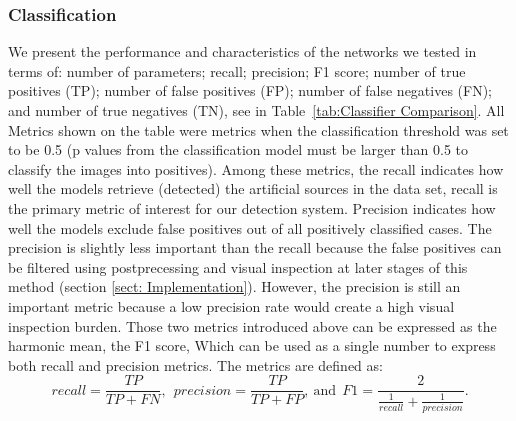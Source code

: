 \subsubsection{Classification} 
\label{subsubsect: Classification}

We present the performance and characteristics of the networks we tested in terms of: number of parameters; recall; precision; F1 score; number of true positives (TP); number of false positives (FP); number of false negatives (FN); and number of true negatives (TN), see in Table~\ref{tab:Classifier Comparison}.
All Metrics shown on the table were metrics when the classification threshold was set to be 0.5 (p values from the classification model must be larger than 0.5 to classify the images into positives).
Among these metrics, the recall indicates how well the models retrieve (detected) the artificial sources in the data set, recall is the primary metric of interest for our detection system.
Precision indicates how well the models exclude false positives out of all positively classified cases.
The precision is slightly less important than the recall because the false positives can be filtered using postprecessing and visual inspection at later stages of this method (section \ref{sect: Implementation}).
However, the precision is still an  important metric because a low precision rate would create a high visual inspection burden. 
Those two metrics introduced above can be expressed as the harmonic mean, the F1 score,
Which can be used as a single number to express both recall and precision metrics. The metrics are defined as:\\
\begin{equation}
    \label{eq:rpf}
    recall = \frac{TP}{TP+FN},\:\:precision=\frac{TP}{TP+FP},\:\textrm{and}\:\:F1 = \frac{2}{\frac{1}{recall}+\frac{1}{precision}}.
\end{equation}

